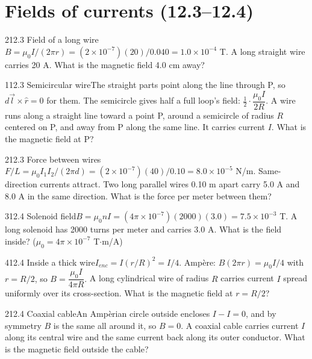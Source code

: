 \documentclass[11pt]{article}
\begin{document}
\section{Fields of currents (12.3--12.4)}

\begin{q}{2}{12.3 Field of a long wire}{$B = \mu_0I/(2\pi r) = (2\times10^{-7})(20)/0.040 = 1.0\times10^{-4}$ T.}
A long straight wire carries 20 A. What is the magnetic field 4.0 cm away?
\end{q}
\begin{q}{1}{12.3 Semicircular wire}{The straight parts point along the line through P, so $d\vec l\times\hat r = 0$ for them. The semicircle gives half a full loop's field: $\tfrac12 \cdot \dfrac{\mu_0 I}{2R}$.}
A wire runs along a straight line toward a point P, around a semicircle of radius $R$ centered on P, and away from P along the same line. It carries current $I$. What is the magnetic field at P?
\end{q}
\begin{q}{2}{12.3 Force between wires}{$F/L = \mu_0 I_1I_2/(2\pi d) = (2\times10^{-7})(40)/0.10 = 8.0\times10^{-5}$ N/m. Same-direction currents attract.}
Two long parallel wires 0.10 m apart carry 5.0 A and 8.0 A in the same direction. What is the force per meter between them?
\end{q}
\begin{q}{3}{12.4 Solenoid field}{$B = \mu_0 nI = (4\pi\times10^{-7})(2000)(3.0) = 7.5\times10^{-3}$ T.}
A long solenoid has 2000 turns per meter and carries 3.0 A. What is the field inside? ($\mu_0 = 4\pi\times10^{-7}$ T$\cdot$m/A)
\end{q}
\begin{q}{4}{12.4 Inside a thick wire}{$I_{enc} = I(r/R)^2 = I/4$. Ampère: $B(2\pi r) = \mu_0 I/4$ with $r = R/2$, so $B = \dfrac{\mu_0 I}{4\pi R}$.}
A long cylindrical wire of radius $R$ carries current $I$ spread uniformly over its cross-section. What is the magnetic field at $r = R/2$?
\end{q}
\begin{q}{2}{12.4 Coaxial cable}{An Ampèrian circle outside encloses $I - I = 0$, and by symmetry $B$ is the same all around it, so $B = 0$.}
A coaxial cable carries current $I$ along its central wire and the same current back along its outer conductor. What is the magnetic field outside the cable?
\end{q}
\end{document}
